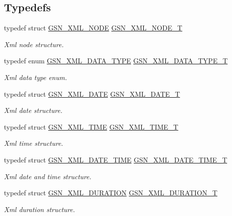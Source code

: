 \subsection*{Typedefs}
\begin{DoxyCompactItemize}
\item 
typedef struct \hyperlink{a00434}{GSN\_\-XML\_\-NODE} \hyperlink{a00679_gafab64ea302554cb05912c7c04d943fe8}{GSN\_\-XML\_\-NODE\_\-T}
\begin{DoxyCompactList}\small\item\em Xml node structure. \end{DoxyCompactList}\item 
typedef enum \hyperlink{a00679_ga0ed9af8f445f8406f6a0a2a84e40eb81}{GSN\_\-XML\_\-DATA\_\-TYPE} \hyperlink{a00679_ga481bc889c92734a49552fb759166b14a}{GSN\_\-XML\_\-DATA\_\-TYPE\_\-T}
\begin{DoxyCompactList}\small\item\em Xml data type enum. \end{DoxyCompactList}\item 
typedef struct \hyperlink{a00431}{GSN\_\-XML\_\-DATE} \hyperlink{a00679_ga3faa58b86cf0dbe597351c634a76b044}{GSN\_\-XML\_\-DATE\_\-T}
\begin{DoxyCompactList}\small\item\em Xml date structure. \end{DoxyCompactList}\item 
typedef struct \hyperlink{a00437}{GSN\_\-XML\_\-TIME} \hyperlink{a00679_ga227674b6a3bbe3f3ce354c361344dacc}{GSN\_\-XML\_\-TIME\_\-T}
\begin{DoxyCompactList}\small\item\em Xml time structure. \end{DoxyCompactList}\item 
typedef struct \hyperlink{a00432}{GSN\_\-XML\_\-DATE\_\-TIME} \hyperlink{a00679_ga6a6787f5abff9dee0723c437f3ce3fb4}{GSN\_\-XML\_\-DATE\_\-TIME\_\-T}
\begin{DoxyCompactList}\small\item\em Xml date and time structure. \end{DoxyCompactList}\item 
typedef struct \hyperlink{a00433}{GSN\_\-XML\_\-DURATION} \hyperlink{a00679_ga86881eeaa017b4544baa061c52d6cd63}{GSN\_\-XML\_\-DURATION\_\-T}
\begin{DoxyCompactList}\small\item\em Xml duration structure. \end{DoxyCompactList}\item 

\end{DoxyCompactItemize}

